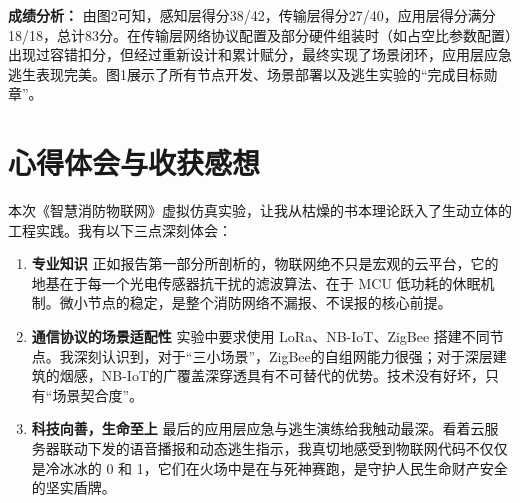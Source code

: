 \documentclass[12pt,a4paper]{ctexart}
\begin{document}
\textbf{成绩分析：} 
由图2可知，感知层得分38/42，传输层得分27/40，应用层得分满分18/18，总计83分。在传输层网络协议配置及部分硬件组装时（如占空比参数配置）出现过容错扣分，但经过重新设计和累计赋分，最终实现了场景闭环，应用层应急逃生表现完美。图1展示了所有节点开发、场景部署以及逃生实验的“完成目标勋章”。


\section{心得体会与收获感想}

\begin{tcolorbox}[colback=accentorange!10!white,colframe=accentorange,title=\textbf{实验总结思考},fonttitle=\bfseries]
本次《智慧消防物联网》虚拟仿真实验，让我从枯燥的书本理论跃入了生动立体的工程实践。我有以下三点深刻体会：

\begin{enumerate}
    \item \textbf{专业知识} 正如报告第一部分所剖析的，物联网绝不只是宏观的云平台，它的地基在于每一个光电传感器抗干扰的滤波算法、在于 MCU 低功耗的休眠机制。微小节点的稳定，是整个消防网络不漏报、不误报的核心前提。
    \item \textbf{通信协议的场景适配性} 实验中要求使用 LoRa、NB-IoT、ZigBee 搭建不同节点。我深刻认识到，对于“三小场景”，ZigBee的自组网能力很强；对于深层建筑的烟感，NB-IoT的广覆盖深穿透具有不可替代的优势。技术没有好坏，只有“场景契合度”。
    \item \textbf{科技向善，生命至上} 最后的应用层应急与逃生演练给我触动最深。看着云服务器联动下发的语音播报和动态逃生指示，我真切地感受到物联网代码不仅仅是冷冰冰的 0 和 1，它们在火场中是在与死神赛跑，是守护人民生命财产安全的坚实盾牌。
\end{enumerate}
\end{tcolorbox}
\end{document}
